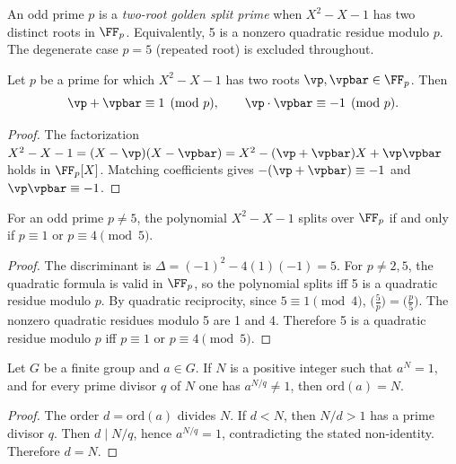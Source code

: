 \begin{definition}
An odd prime $p$ is a \emph{two-root golden split prime} when $X^2 - X - 1$ has two distinct roots in $\FF_p$. Equivalently, 5 is a nonzero quadratic residue modulo $p$. The degenerate case $p = 5$ (repeated root) is excluded throughout.
\end{definition}

\begin{lemma}\label{lem:rootprod}
Let $p$ be a prime for which $X^2 - X - 1$ has two roots $\vp, \vpbar \in \FF_p$. Then
\[
\vp + \vpbar \equiv 1 \pmod{p}, \qquad \vp \cdot \vpbar \equiv -1 \pmod{p}.
\]
\end{lemma}

\begin{proof}
The factorization $X^2 - X - 1 = (X - \vp)(X - \vpbar) = X^2 - (\vp + \vpbar)X + \vp\vpbar$ holds in $\FF_p[X]$. Matching coefficients gives $-(\vp + \vpbar) \equiv -1$ and $\vp\vpbar \equiv -1$. \qedhere
\end{proof}

\begin{lemma}\label{lem:splitting}
For an odd prime $p \neq 5$, the polynomial $X^2 - X - 1$ splits over $\FF_p$ if and only if $p \equiv 1$ or $p \equiv 4 \pmod{5}$.
\end{lemma}

\begin{proof}
The discriminant is $\Delta = (-1)^2 - 4(1)(-1) = 5$. For $p \neq 2, 5$, the quadratic formula is valid in $\FF_p$, so the polynomial splits iff 5 is a quadratic residue modulo $p$. By quadratic reciprocity, since $5 \equiv 1 \pmod{4}$, $\bigl(\frac{5}{p}\bigr) = \bigl(\frac{p}{5}\bigr)$. The nonzero quadratic residues modulo 5 are 1 and 4. Therefore 5 is a quadratic residue modulo $p$ iff $p \equiv 1$ or $p \equiv 4 \pmod{5}$. \qedhere
\end{proof}

\begin{lemma}\label{lem:order}
Let $G$ be a finite group and $a \in G$. If $N$ is a positive integer such that $a^N = 1$, and for every prime divisor $q$ of $N$ one has $a^{N/q} \neq 1$, then $\mathrm{ord}(a) = N$.
\end{lemma}

\begin{proof}
The order $d = \mathrm{ord}(a)$ divides $N$. If $d < N$, then $N/d > 1$ has a prime divisor $q$. Then $d \mid N/q$, hence $a^{N/q} = 1$, contradicting the stated non-identity. Therefore $d = N$. \qedhere
\end{proof}

